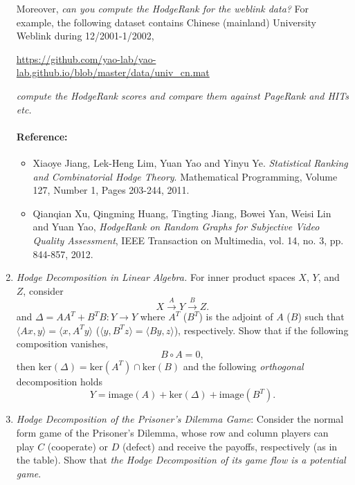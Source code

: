 \documentclass[11pt]{article}
\def\R{{\mathbb R}}
\def\im{{\mathrm{image}}}
\def\ker{{\mathrm{ker}}}
\begin{document}
\begin{enumerate}
Moreover, \emph{can you compute the HodgeRank for the weblink data?} For example, the following dataset contains Chinese (mainland) University Weblink during 12/2001-1/2002,

\url{https://github.com/yao-lab/yao-lab.github.io/blob/master/data/univ_cn.mat}

\emph{compute the HodgeRank scores and compare them against PageRank and HITs etc.}

\paragraph{Reference:}
\begin{itemize}
\item Xiaoye Jiang, Lek-Heng Lim, Yuan Yao and Yinyu Ye. \emph{Statistical Ranking and Combinatorial Hodge Theory}.
Mathematical Programming, Volume 127, Number 1, Pages 203-244, 2011.
\item Qianqian Xu, Qingming Huang, Tingting Jiang, Bowei Yan, Weisi Lin and Yuan Yao, \emph{HodgeRank on Random Graphs for Subjective Video Quality  
Assessment}, IEEE Transaction on Multimedia, vol. 14, no. 3, pp. 844-857, 2012.
\end{itemize}


\item {\em Hodge Decomposition in Linear Algebra.} For inner product spaces $X$, $Y$, and $Z$, consider	
	\[
	X \xrightarrow{A} Y \xrightarrow{B} Z.
	\]
	and $\Delta =A A^T + B^T B: Y\to Y$ where $A^T$ ($B^T$) is the adjoint of $A$ ($B$) such that $\langle Ax,y\rangle=\langle x, A^T y\rangle$ ($\langle y,B^Tz\rangle=\langle By, z\rangle$), respectively.
	Show that if the following composition vanishes,
	\[ B \circ A = 0,\]
	then $\ker(\Delta) = \ker(A^T) \cap \ker(B)$ and the following \emph{orthogonal} decomposition holds
	\[ Y = \im (A) + \ker(\Delta) + \im (B^T). \]
	

\item {\em *Hodge Decomposition of the Prisoner's Dilemma Game}: Consider the normal form game of the Prisoner's Dilemma, whose row and column players can play $C$ (cooperate) or $D$ (defect) and receive the payoffs, respectively (as in the table). Show that \emph{the Hodge Decomposition of its game flow is a potential game}.   



\end{enumerate}
\end{document}
